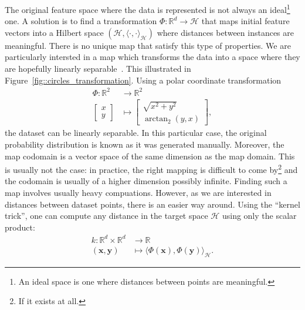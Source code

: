                 The original feature space where the data is represented is not always an ideal\footnote{An ideal space is one where distances between points are meaningful.} one.
                A solution is to find a transformation $\Phi: \mathbb{R}^d \rightarrow \mathscr{H}$ that maps initial feature vectors into a Hilbert space $(\mathscr{H}, \langle\cdot{,}\cdot\rangle_{\mathscr{H}})$ where distances between instances are meaningful.
                There is no unique map that satisfy this type of properties.
                We are particularly intersted in a map which transforms the data into a space where they are hopefully linearly separable~\parencite{boser1992training}.
                This illustrated in Figure~\ref{fig::circles_transformation}.
                Using a polar coordinate transformation 
                \begin{align*}
                    \Phi: \mathbb{R}^2 &\rightarrow \mathbb{R}^2 \\
                    \begin{bmatrix}
                        x \\
                        y
                    \end{bmatrix} &\mapsto \begin{bmatrix}
                        \sqrt{x^2 + y^2} \\
                        \operatorname{arctan}_2(y, x)
                    \end{bmatrix},
                \end{align*}
                the dataset can be linearly separable.
                In this particular case, the original probability distribution is known as it was generated manually.
                Moreover, the map codomain is a vector space of the same dimension as the map domain.
                This is usually not the case: in practice, the right mapping is difficult to come by\footnote{If it exists at all.} and the codomain is usually of a higher dimension possibly infinite.
                Finding such a map involves usually heavy compuations.
                However, as we are interested in distances between dataset points, there is an easier way around.
                Using the ``kernel trick'', one can compute any distance in the target space $\mathscr{H}$ using only the scalar product:
                \begin{align}
                    \label{eq::kernel_definition}
                    k: \mathbb{R}^d \times \mathbb{R}^d &\rightarrow \mathbb{R}\\
                    (\bm{x}, \bm{y}) &\mapsto \langle\Phi(\bm{x}), \Phi(\bm{y})\rangle_{\mathscr{H}} \nonumber.
                \end{align}
